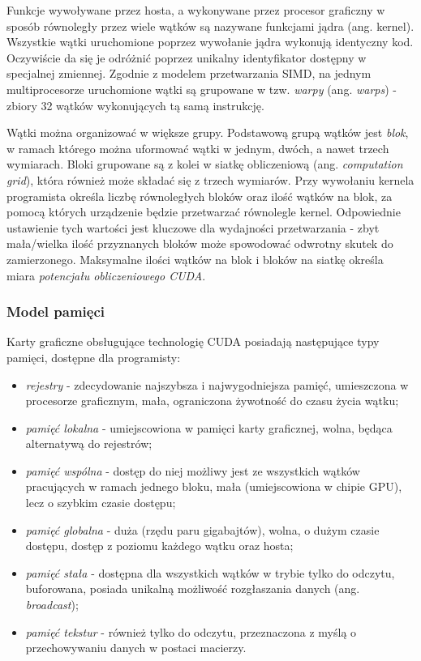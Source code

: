 \documentclass[12pt]{article}
\begin{document}
Funkcje wywoływane przez hosta, a wykonywane przez procesor graficzny w sposób równoległy przez wiele wątków są nazywane funkcjami jądra (ang. kernel). Wszystkie wątki uruchomione poprzez wywołanie jądra wykonują identyczny kod. Oczywiście da się je odróżnić poprzez unikalny identyfikator dostępny w specjalnej zmiennej. Zgodnie z modelem przetwarzania SIMD, na jednym multiprocesorze uruchomione wątki są grupowane w tzw. \textit{warpy} (ang. \textit{warps}) - zbiory 32 wątków wykonujących tą samą instrukcję. 

Wątki można organizować w większe grupy. Podstawową grupą wątków jest \textit{blok}, w ramach którego można uformować wątki w jednym, dwóch, a nawet trzech wymiarach. Bloki grupowane są z kolei w siatkę obliczeniową (ang. \textit{computation grid}), która również może składać się z trzech wymiarów. Przy wywołaniu kernela programista określa liczbę równoległych bloków oraz ilość wątków na blok, za pomocą których urządzenie będzie przetwarzać równolegle kernel. Odpowiednie ustawienie tych wartości jest kluczowe dla wydajności przetwarzania - zbyt mała/wielka ilość przyznanych bloków może spowodować odwrotny skutek do zamierzonego. Maksymalne ilości wątków na blok i bloków na siatkę określa miara \textit{potencjału obliczeniowego CUDA}. 

\subsubsection{Model pamięci}

Karty graficzne obsługujące technologię CUDA posiadają następujące typy pamięci, dostępne dla programisty:

\begin{itemize}
\item \textit{rejestry} - zdecydowanie najszybsza i najwygodniejsza pamięć, umieszczona w procesorze graficznym, mała, ograniczona żywotność do czasu życia wątku;
\item \textit{pamięć lokalna} - umiejscowiona w pamięci karty graficznej, wolna, będąca alternatywą do rejestrów;
\item \textit{pamięć wspólna} - dostęp do niej możliwy jest ze wszystkich wątków pracujących w ramach jednego bloku, mała (umiejscowiona w chipie GPU), lecz o szybkim czasie dostępu;
\item \textit{pamięć globalna} - duża (rzędu paru gigabajtów), wolna, o dużym czasie dostępu, dostęp z poziomu każdego wątku oraz hosta;
\item \textit{pamięć stała} - dostępna dla wszystkich wątków w trybie tylko do odczytu, buforowana, posiada unikalną możliwość rozgłaszania danych (ang. \textit{broadcast});
\item \textit{pamięć tekstur} - również tylko do odczytu, przeznaczona z myślą o przechowywaniu danych w postaci macierzy.
\end{itemize}
\end{document}
